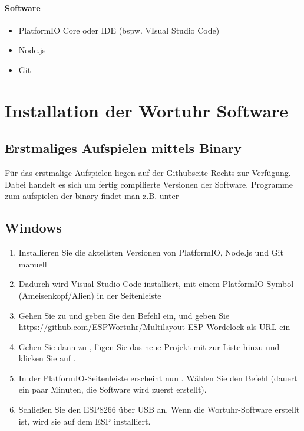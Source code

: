 \documentclass[12pt,a4paper, german,oneside, headinclude, headsepline,plainheadsepline,BCOR20mm, DIV18,parskip=half, openright, numbers=noenddot, captions=tableheading,version=first,listof=totoc,version=first]{scrbook}
\begin{document}
\subsubsection{Software}

\begin{itemize}
    \item PlatformIO Core oder IDE (bspw. VIsual Studio Code)
    \item Node.js
    \item Git
\end{itemize}

\chapter{Installation der Wortuhr Software}

\section{Erstmaliges Aufspielen mittels Binary}
Für das erstmalige Aufspielen liegen auf der Githubseite Rechts  zur Verfügung. Dabei handelt es sich um fertig compilierte Versionen der Software. Programme zum aufspielen der binary findet man z.B. unter 

\section{Windows}

\begin{enumerate}
    \item Installieren Sie die aktellsten Versionen von PlatformIO, Node.js und Git manuell
    \item Dadurch wird Visual Studio Code installiert, mit einem PlatformIO-Symbol (Ameisenkopf/Alien) in der Seitenleiste
    \item Gehen Sie zu  und geben Sie den Befehl  ein, und geben Sie \href{https://github.com/ESPWortuhr/Multilayout-ESP-Wordclock}{https://github.com/ESPWortuhr/Multilayout-ESP-Wordclock} als URL ein
    \item Gehen Sie dann zu , fügen Sie das neue Projekt mit  zur Liste hinzu und klicken Sie auf .
    \item In der PlatformIO-Seitenleiste erscheint nun . Wählen Sie den Befehl  (dauert ein paar Minuten, die Software wird zuerst erstellt).
    \item Schließen Sie den ESP8266 über USB an. Wenn die Wortuhr-Software erstellt ist, wird sie auf dem ESP installiert.
\end{enumerate}
\end{document}

